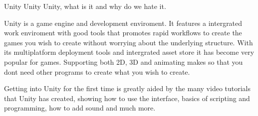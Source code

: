 Unity Unity Unity, what is it and why do we hate it.

Unity is a game engine and development enviroment.
It features a intergrated work enviroment with good tools that promotes rapid workflows to create the games you wish to create without worrying about the underlying structure.
With its multiplatform deployment tools and intergrated asset store it has become very popular for games.
Supporting both 2D, 3D and animating makes so that you dont need other programs to create what you wish to create.

Getting into Unity for the first time is greatly aided by the many video tutorials that Unity has created, showing how to use the interface, basics of scripting and programming, how to add sound and much more.

